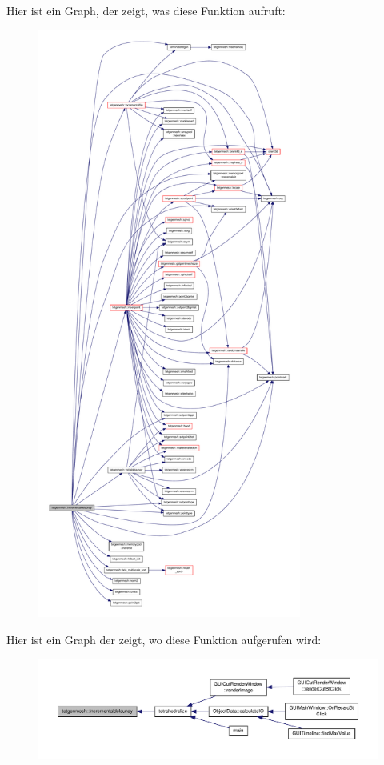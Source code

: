 Hier ist ein Graph, der zeigt, was diese Funktion aufruft\-:
\nopagebreak
\begin{figure}[H]
\begin{center}
\leavevmode
\includegraphics[height=550pt]{classtetgenmesh_a5a5a0513d0bea7aa457eb0bc5fad1b02_cgraph}
\end{center}
\end{figure}




Hier ist ein Graph der zeigt, wo diese Funktion aufgerufen wird\-:
\nopagebreak
\begin{figure}[H]
\begin{center}
\leavevmode
\includegraphics[width=350pt]{classtetgenmesh_a5a5a0513d0bea7aa457eb0bc5fad1b02_icgraph}
\end{center}
\end{figure}


